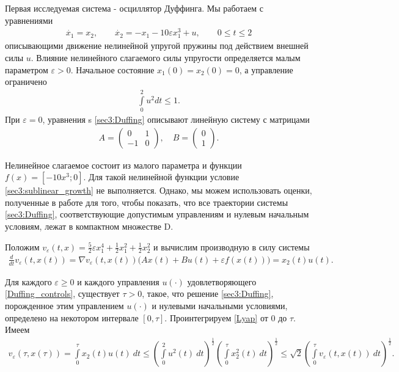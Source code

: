 \documentclass[../main.tex]{subfiles}
\begin{document}
\begin{pr}
    Первая исследуемая система - осциллятор Дуффинга. 
    Мы работаем с уравнениями
    \begin{gather}\label{sec3:Duffing}
        \dot{x_1} = x_2, \qquad
        \dot{x_2} = -x_1 - 10 \varepsilon x_1^3 + u ,\qquad 0\leqslant t  \leqslant 2
    \end{gather}
    описывающими движение нелинейной упругой пружины под действием внешней силы $u$. 
    Влияние нелинейного слагаемого силы упругости определяется малым параметром $\varepsilon > 0$. Начальное состояние $x_1(0) = x_2(0) = 0 $, а управление ограничено 
    \begin{gather}\label{Duffing_controls}
        \int\limits_0^2u^2dt \leqslant 1.
    \end{gather}
    При $\varepsilon = 0$, уравнения s \eqref{sec3:Duffing} описывают линейную систему с матрицами 
    \begin{gather*}
        A = \begin{pmatrix} 0 & 1\\
            -1 & 0
        \end{pmatrix}, \quad B = \begin{pmatrix}
            0\\
            1
        \end{pmatrix}.
    \end{gather*}
    
    Нелинейное слагаемое состоит из малого параметра и функции $f(x) = [-10x^3;0]$. 
    Для такой нелинейной функции условие  \eqref{sec3:sublinear_growth} не выполняется. 
    Однако, мы можем использовать оценки, полученные в работе  \cite{Zykov2019} для того, чтобы показать, что все траектории системы \eqref{sec3:Duffing}, соответствующие допустимым управлениям и нулевым начальным условиям, лежат в компактном множестве D. 
    
    Положим $v_{\varepsilon}(t,x) = \frac{5}{2}\varepsilon x_1^4 + \frac{1}{2}x_1^2 + \frac{1}{2}x_2^2$ и вычислим производную в силу системы 
    \begin{gather}\label{Lyap}
        \frac{d}{dt} v_{\varepsilon}(t,x(t)) = \nabla v_{\varepsilon}(t,x(t)) \big(A x(t) + B u(t) + \varepsilon f(x(t))\big) = x_2(t) u(t). 
    \end{gather} 
    
    Для каждого $\varepsilon \geqslant 0$ и каждого управления $u(\cdot)$ удовлетворяющего \eqref{Duffing_controls}, существует $\tau>0$, такое, что решение \eqref{sec3:Duffing}, порожденное этим управлением $u(\cdot)$ и нулевыми начальными условиями, определено на некотором интервале $[0, \tau]$. 
    Проинтегрируем \eqref{Lyap} от $0$ до $\tau$. 
    Имеем 
    \begin{gather*}
        v_{\varepsilon}(\tau,x(\tau)) =
        \int\limits_0^{\tau} x_2(t) u(t) \ dt 
        \leqslant 
        \left(\int\limits_0^2 u^2(t) \ dt \right)^{\frac{1}{2}} \left(\int\limits_0^{\tau} x_2^2(t) \ dt \right)^{\frac{1}{2}} \leqslant \sqrt{2} \left(\int\limits_0^{\tau} v_{\varepsilon}(t,x(t)) \ dt \right)^{\frac{1}{2}}.
    \end{gather*}
    

\end{pr}
\end{document}
